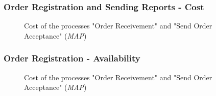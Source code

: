 
%
\subsubsection{Order Registration and Sending Reports - Cost}
\label{sec:order_analysis}
\begin{center}
	\begin{figure}[H]
		\centering
		\setlength\fboxsep{7pt}
		\setlength\fboxrule{0.5pt}
		\caption{Cost of the processes "Order Receivement" and "Send Order Acceptance" (\emph{MAP})}
		\label{fig:map_order_cost_to_be}
	\end{figure}
\end{center}

%
\subsubsection{Order Registration - Availability}
\label{sec:order_availability_to_be}
\begin{center}
	\begin{figure}[H]
		\centering
		\setlength\fboxsep{7pt}
		\setlength\fboxrule{0.5pt}
		\caption{Cost of the processes "Order Receivement" and "Send Order Acceptance" (\emph{MAP})}
		\label{fig:map_order_availability_to_be}
	\end{figure}
\end{center}







